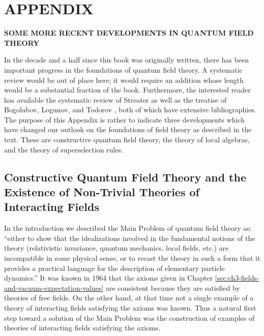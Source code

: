 \renewcommand{\theHequation}{A.\arabic{equation}}
\section*{APPENDIX}
{}
\label{sec:appendix-recent-developments}
\begin{center}
  {\Large\bfseries SOME MORE RECENT DEVELOPMENTS IN QUANTUM FIELD THEORY}
\end{center}
\medskip

In the decade and a half since this book was originally written, there has
been important progress in the foundations of quantum field theory. A
systematic review would be out of place here; it would require an addition
whose length would be a substantial fraction of the book. Furthermore, the
interested reader has available the systematic review of Streater \cite{pct-app-1} as well
as the treatise of Bogolubov, Logunov, and Todorov \cite{pct-app-2}, both of which have
extensive bibliographies. The purpose of this Appendix is rather to indicate
three developments which have changed our outlook on the foundations of field
theory as described in the text. These are constructive quantum field theory,
the theory of local algebras, and the theory of superselection rules.

\subsection*{Constructive Quantum Field Theory and the Existence of Non-Trivial Theories of Interacting Fields}
{}
\label{sec:appendix-constructive}

In the introduction we described the Main Problem of quantum field theory as:
``either to show that the idealizations involved in the fundamental notions of
the theory (relativistic invariance, quantum mechanics, local fields, etc.) are
incompatible in some physical sense, or to recast the theory in such a form
that it provides a practical language for the description of elementary
particle dynamics.'' It was known in 1964 that the axioms given in Chapter \ref{sec:ch3-fields-and-vacuum-expectation-values}
are consistent because they are satisfied by theories of free fields. On the
other hand, at that time not a single example of a theory of interacting
fields satisfying the axioms was known. Thus a natural first step toward a
solution of the Main Problem was the construction of examples of theories of
interacting fields satisfying the axioms.

